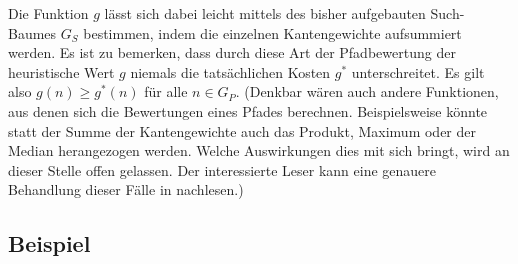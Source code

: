 Die Funktion $g$ lässt sich dabei leicht mittels des bisher aufgebauten Such-Baumes $G_{S}$ bestimmen, indem die einzelnen Kantengewichte aufsummiert werden.
Es ist zu bemerken, dass durch diese Art der Pfadbewertung der heuristische Wert $g$ niemals die tatsächlichen Kosten $g^{*}$ unterschreitet.
Es gilt also $g(n) \geq g^{*}(n)$ für alle $n \in G_{P}$.
(Denkbar wären auch andere Funktionen, aus denen sich die Bewertungen eines Pfades berechnen. Beispielsweise könnte statt der Summe der Kantengewichte auch das Produkt, Maximum oder der Median herangezogen werden. Welche Auswirkungen dies mit sich bringt, wird an dieser Stelle offen gelassen. Der interessierte Leser kann eine genauere Behandlung dieser Fälle in \cite{Dechter:1985:GBS:3828.3830} nachlesen.)

\subsection{Beispiel}

